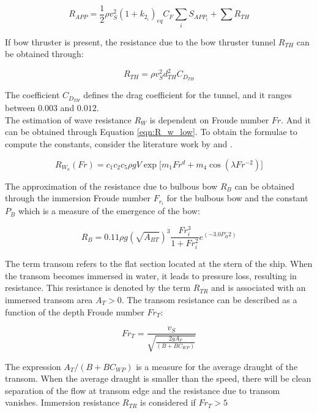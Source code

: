 \documentclass[]{interact}
\theoremstyle{plain}%
\theoremstyle{definition}
\theoremstyle{remark}
\begin{document}
\begin{equation}\label{eqn:R_app}
  R_{APP} = \frac{1}{2}\rho v_S^2 (1+k_{2_i})_{eq} C_F \sum_i S_{APP_i} + \sum R_{TH}
\end{equation}

If bow thruster is present, the resistance due to the bow thruster tunnel $R_{TH}$ can be obtained through:

\begin{equation}
  \label{eqn:R_th}
  R_{TH} = \rho v_S^2  d_{TH}^2 C_{D_{TH}}
\end{equation}

The coefficient $C_{D_{TH}}$ defines the drag coefficient for the tunnel, and it ranges between $0.003$ and $0.012$.\\

The estimation of wave resistance $R_W$ is dependent on Froude number $Fr$. And it can be obtained through Equation \ref{eqn:R_w_low}. To obtain the formulae to compute the constants, consider the literature work by \citet{Holtrop.1978,Holtrop.1982,Holtrop.1984} and \citet{Birk.2019}.

\begin{equation}\label{eqn:R_w_low}
  R_{W_a}(Fr) = c_1 c_2 c_5 \rho g V  \exp \biggl[ m_1 Fr^d + m_4 \cos(\lambda Fr ^{-2}) \biggr]
\end{equation}

The approximation of the resistance due to bulbous bow $R_B$ can be obtained through the immersion Froude number $F_{r_i}$ for the bulbous bow and the constant $P_B$ which is a measure of the emergence of the bow: 

\begin{equation}
  \label{eqn:Rbulb}
  R_B = 0.11 \rho g (\sqrt{A_{BT}})^3 \frac{Fr_{i}^3}{1+Fr_{i}^2}e^{(-3.0P_B^-2)}
\end{equation}

The term transom refers to the flat section located at the stern of the ship. When the transom becomes immersed in water, it leads to pressure loss, resulting in resistance. This resistance is denoted by the term $R_{TR}$ and is associated with an immersed transom area $A_T > 0$. The transom resistance can be described as a function of the depth Froude number $Fr_{T}$:

\begin{equation}
  \label{eqn:Fr_t}
  Fr_T = \frac{v_S}{\sqrt{\frac{2gA_T}{(B+BC_{WP})}}}
\end{equation}

The expression $A_T/(B+BC_{WP})$ is a measure for the average draught of the transom. When the average draught is smaller than the speed, there will be clean separation of the flow at transom edge and the resistance due to transom vanishes. Immersion resistance $R_{TR}$ is considered if $Fr_{T} > 5$
\end{document}
